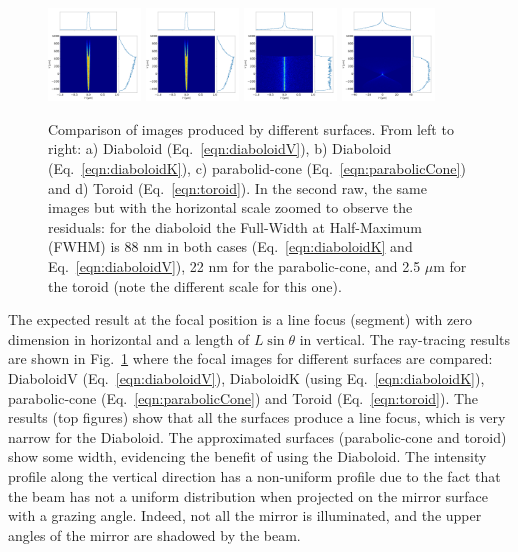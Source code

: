 \documentclass[a4paper, 11pt]{article}
\begin{document}
\begin{figure}[h]
\includegraphics[width=0.22\textwidth]{figures/p2s_V_z.png}
\includegraphics[width=0.22\textwidth]{figures/p2s_K_z.png}
\includegraphics[width=0.22\textwidth]{figures/p2s_parabolic-cone_z.png}
\includegraphics[width=0.22\textwidth]{figures/p2s_toroid_z.png}
\caption{\label{fig:pointToSegment}Comparison of images produced by different surfaces. From left to right: a) Diaboloid (Eq.~\ref{eqn:diaboloidV}), b) Diaboloid (Eq.~\ref{eqn:diaboloidK}), c) parabolid-cone (Eq.~\ref{eqn:parabolicCone}) and d) Toroid (Eq.~\ref{eqn:toroid}). In the second raw, the same images but with the horizontal scale zoomed to observe the residuals: for the diaboloid the Full-Width at Half-Maximum (FWHM) is 88 nm in both cases (Eq.~\ref{eqn:diaboloidK} and Eq.~\ref{eqn:diaboloidV}), 22 nm for the parabolic-cone, and 2.5 $\mu$m for the toroid (note the different scale for this one).
}
\end{figure}

The expected result at the focal position is a line focus (segment) with zero dimension in horizontal and a length of $L\sin\theta$ in vertical. The ray-tracing results are shown in Fig.~\ref{fig:pointToSegment} where the focal images for different surfaces are compared: DiaboloidV (Eq.~\ref{eqn:diaboloidV}), DiaboloidK (using Eq.~\ref{eqn:diaboloidK}), parabolic-cone (Eq.~\ref{eqn:parabolicCone}) and Toroid (Eq.~\ref{eqn:toroid}). The results (top figures) show that all the surfaces produce a line focus, which is very narrow for the Diaboloid. The approximated surfaces (parabolic-cone and toroid) show some width, evidencing the benefit of using the Diaboloid. The intensity profile along the vertical direction has a non-uniform profile due to the fact that the beam has not a uniform distribution when projected on the mirror surface with a grazing angle. Indeed, not all the mirror is illuminated, and the upper angles of the mirror are shadowed by the beam. 
\end{document}
